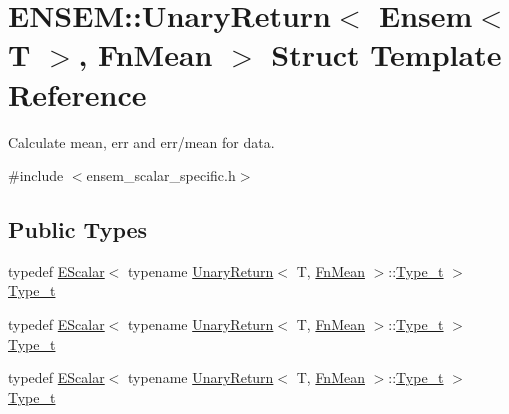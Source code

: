 \hypertarget{structENSEM_1_1UnaryReturn_3_01Ensem_3_01T_01_4_00_01FnMean_01_4}{}\section{E\+N\+S\+EM\+:\+:Unary\+Return$<$ Ensem$<$ T $>$, Fn\+Mean $>$ Struct Template Reference}
\label{structENSEM_1_1UnaryReturn_3_01Ensem_3_01T_01_4_00_01FnMean_01_4}


Calculate mean, err and err/mean for data.  




{\ttfamily \#include $<$ensem\+\_\+scalar\+\_\+specific.\+h$>$}

\subsection*{Public Types}
\begin{DoxyCompactItemize}
\item 
typedef \mbox{\hyperlink{classENSEM_1_1EScalar}{E\+Scalar}}$<$ typename \mbox{\hyperlink{structENSEM_1_1UnaryReturn}{Unary\+Return}}$<$ T, \mbox{\hyperlink{structENSEM_1_1FnMean}{Fn\+Mean}} $>$\+::\mbox{\hyperlink{structENSEM_1_1UnaryReturn_3_01Ensem_3_01T_01_4_00_01FnMean_01_4_aecb00ba039f774eb3f7e9c0d788867a6}{Type\+\_\+t}} $>$ \mbox{\hyperlink{structENSEM_1_1UnaryReturn_3_01Ensem_3_01T_01_4_00_01FnMean_01_4_aecb00ba039f774eb3f7e9c0d788867a6}{Type\+\_\+t}}
\item 
typedef \mbox{\hyperlink{classENSEM_1_1EScalar}{E\+Scalar}}$<$ typename \mbox{\hyperlink{structENSEM_1_1UnaryReturn}{Unary\+Return}}$<$ T, \mbox{\hyperlink{structENSEM_1_1FnMean}{Fn\+Mean}} $>$\+::\mbox{\hyperlink{structENSEM_1_1UnaryReturn_3_01Ensem_3_01T_01_4_00_01FnMean_01_4_aecb00ba039f774eb3f7e9c0d788867a6}{Type\+\_\+t}} $>$ \mbox{\hyperlink{structENSEM_1_1UnaryReturn_3_01Ensem_3_01T_01_4_00_01FnMean_01_4_aecb00ba039f774eb3f7e9c0d788867a6}{Type\+\_\+t}}
\item 
typedef \mbox{\hyperlink{classENSEM_1_1EScalar}{E\+Scalar}}$<$ typename \mbox{\hyperlink{structENSEM_1_1UnaryReturn}{Unary\+Return}}$<$ T, \mbox{\hyperlink{structENSEM_1_1FnMean}{Fn\+Mean}} $>$\+::\mbox{\hyperlink{structENSEM_1_1UnaryReturn_3_01Ensem_3_01T_01_4_00_01FnMean_01_4_aecb00ba039f774eb3f7e9c0d788867a6}{Type\+\_\+t}} $>$ \mbox{\hyperlink{structENSEM_1_1UnaryReturn_3_01Ensem_3_01T_01_4_00_01FnMean_01_4_aecb00ba039f774eb3f7e9c0d788867a6}{Type\+\_\+t}}
\end{DoxyCompactItemize}


